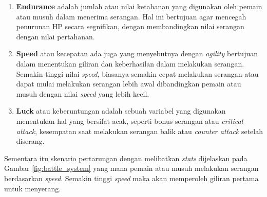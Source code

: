 \begin{enumerate}[label=\textbf{\arabic*).}]
\begin{enumerate}[label=\alph*).]
		\item \textbf{Endurance} adalah jumlah atau nilai ketahanan yang digunakan oleh pemain atau musuh dalam menerima serangan. Hal ini bertujuan agar mencegah penurunan HP secara segnifikan, dengan membandingkan nilai serangan dengan nilai pertahanan.
		
		\item \textbf{Speed} atau kecepatan ada juga yang menyebutnya dengan \textit{agility} bertujuan dalam menentukan giliran dan keberhasilan dalam melakukan serangan. Semakin tinggi nilai \textit{speed}, biasanya semakin cepat melakukan serangan atau dapat mulai melakukan serangan lebih awal dibandingkan pemain atau musuh dengan nilai \textit{speed} yang lebih kecil.
		
		\item \textbf{Luck} atau keberuntungan adalah sebuah variabel yang digunakan menentukan hal yang bersifat acak, seperti bonus serangan atau \textit{critical attack}, kesempatan saat melakukan serangan balik atau \textit{counter attack} setelah diserang.
	\end{enumerate}
	
	Sementara itu skenario pertarungan dengan melibatkan \textit{stats} dijelaskan pada Gambar \ref{fig:battle_system} yang mana pemain atau musuh melakukan serangan berdasarkan \textit{speed}. Semakin tinggi \textit{speed} maka akan memperoleh giliran pertama untuk menyerang.
	\vspace{1ex}
	

\end{enumerate}
